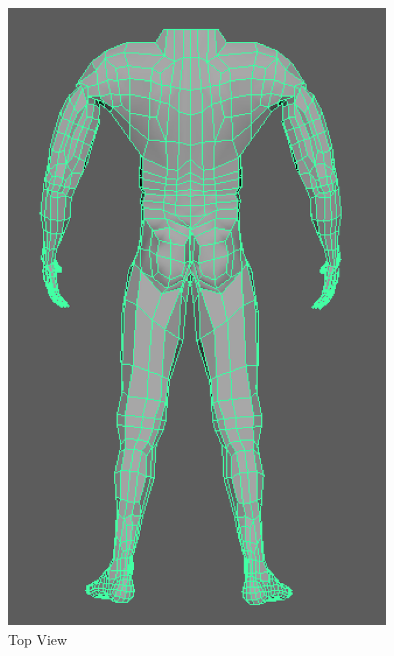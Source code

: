 \documentclass[a4paper]{article}
\begin{document}
\begin{figure}[h]
\centering
\includegraphics[width=10cm]{img/Back.png}
\caption{Top View}
\label{fig:Angle View}
\end{figure}
\end{document}
